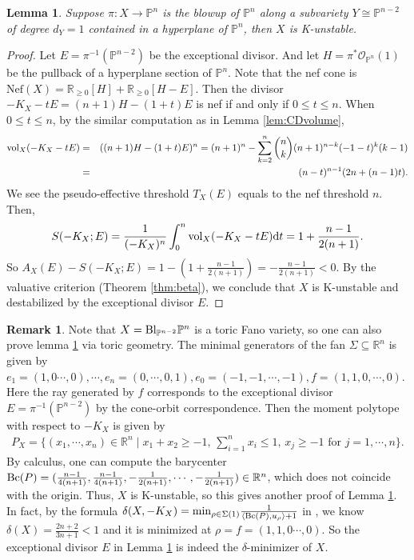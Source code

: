 \documentclass[12pt]{amsart}
\newtheorem{lem}[thm]{Lemma}
\theoremstyle{definition}
\newtheorem{rmk}[thm]{Remark}
\def\min{{\rm min}}
\def\dif{{\rm d}}
\def\bl{{\rm Bl}}
\def\vol{{\rm vol}}
\def\bc{{\rm Bc}}
\newcommand{\IP}{{\mathbb P}}
\newcommand{\IR}{{\mathbb R}}
\newcommand{\CO}{{\mathcal O}}
\newcommand{\lee}{\leqslant}
\newcommand{\gee}{\geqslant}
\begin{document}
\begin{lem}\label{lem-CDunstable}
    Suppose $\pi\colon X\rightarrow \IP^n$ is the blowup of $\IP^n$ along a subvariety $Y\cong \IP^{n-2}$ of degree $d_Y=1$ contained in a hyperplane of $\IP^n$, then $X$ is K-unstable.
\end{lem}
\begin{proof}
    Let $E = \pi^{-1}(\IP^{n-2})$ be the exceptional divisor. And let $H=\pi^*\CO_{\IP^n}(1)$ be the pullback of a hyperplane section of $\IP^n$. Note that the nef cone is $\text{Nef}(X)=\IR_{\gee 0}[H]+\IR_{\gee 0}[H-E]$. Then the divisor $-K_{X}-tE=(n+1)H-(1+t)E$ is nef if and only if $0\lee t\lee n$. When $0\lee t\lee n$, by the similar computation as in Lemma \ref{lem:CDvolume},
    \begin{eqnarray*}
        \vol_{X}(-K_X-tE)&=&((n+1)H-(1+t)E)^n=(n+1)^n-\sum_{k=2}^n \binom{n}{k}(n+1)^{n-k}(-1-t)^{k}(k-1)\\
        &=& (n-t)^{n-1}(2n+(n-1)t).
    \end{eqnarray*}
    We see the pseudo-effective threshold $T_X(E)$ equals to the nef threshold $n$. Then, 
    \begin{eqnarray*}
        S(-K_X;E)=\frac{1}{(-K_X)^n}\int_0^n\vol_X(-K_X-tE) \dif t = 1+\frac{n-1}{2(n+1)}.
    \end{eqnarray*}
    So $A_X(E)-S(-K_X;E)=1-(1+\frac{n-1}{2(n+1)})=-\frac{n-1}{2(n+1)}<0$. By the valuative criterion (Theorem \ref{thm:beta}), we conclude that $X$ is K-unstable and destabilized by the exceptional divisor $E$.
\end{proof}
\begin{rmk}
    Note that $X=\bl_{\IP^{n-2}}\IP^n$ is a toric Fano variety, so one can also prove lemma \ref{lem-CDunstable} via toric geometry. The minimal generators of the fan $\Sigma\subseteq \IR^n$ is given by $e_1=(1,0\cdots,0),\cdots, e_n=(0,\cdots,0,1), e_0=(-1,-1,\cdots,-1), f=(1,1,0,\cdots,0)$. Here the ray generated by $f$ corresponds to the exceptional divisor $E=\pi^{-1}(\IP^{n-2})$ by the cone-orbit correspondence. Then the moment polytope with respect to $-K_X$ is given by
    \begin{eqnarray*}
        P_X =\{(x_1,\cdots,x_n)\in \IR^n \mid x_1+x_2\geq -1,\,\sum_{i=1}^n x_i\leq 1,\,x_j\geq -1 \,\,\text{for}\,\, j=1,\cdots,n\}.
    \end{eqnarray*}
    By calculus, one can compute the barycenter $\bc(P)=(\frac{n-1}{4(n+1)},\frac{n-1}{4(n+1)}, -\frac{1}{2(n+1)},\cdots, -\frac{1}{2(n+1)})\in \IR^n$, which does not coincide with the origin. Thus, $X$ is K-unstable, so this gives another proof of Lemma \ref{lem-CDunstable}. In fact, by the formula $\delta(X,-K_X)=\min_{\rho\in \Sigma(1)}\frac{1}{\langle \bc(P),u_{\rho}\rangle+1}$ in \cite[Section 7]{BJ20}, we know $\delta(X) = \frac{2n+2}{3n+1}<1$ and it is minimized at $\rho=f=(1,1,0\cdots,0)$. So the exceptional divisor $E$ in Lemma \ref{lem-CDunstable} is indeed the $\delta$-minimizer of $X$.
\end{rmk}
\end{document}
